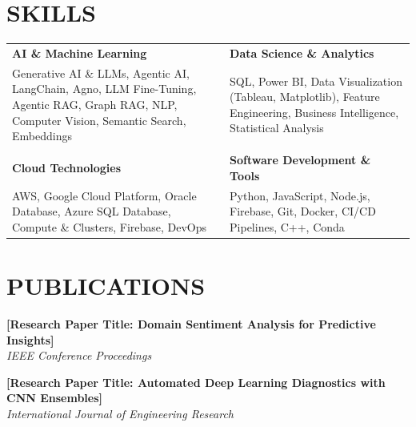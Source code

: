 \documentclass[a4paper,11pt]{article}
\newcommand{\safehref}[2]{#2}
\let\href\safehref
\newcommand{\extlink}{\raisebox{0.2ex}{\scriptsize\faExternalLink*}}
\begin{document}
\section*{SKILLS}
\setlength{\tabcolsep}{10pt}
\renewcommand{\arraystretch}{1.0}
\begin{tabularx}{\textwidth}{@{}>{\RaggedRight\arraybackslash}X >{\RaggedRight\arraybackslash}X@{}}
  \textbf{AI \& Machine Learning} & \textbf{Data Science \& Analytics} \\
  Generative AI \& LLMs, Agentic AI, LangChain, Agno, LLM Fine-Tuning, Agentic RAG, Graph RAG, NLP, Computer Vision, Semantic Search, Embeddings &
  SQL, Power BI, Data Visualization (Tableau, Matplotlib), Feature Engineering, Business Intelligence, Statistical Analysis \\
  \\[-3pt]
  \textbf{Cloud Technologies} & \textbf{Software Development \& Tools} \\
  AWS, Google Cloud Platform, Oracle Database, Azure SQL Database, Compute \& Clusters, Firebase, DevOps &
  Python, JavaScript, Node.js, Firebase, Git, Docker, CI/CD Pipelines, C++, Conda \\
\end{tabularx}

\section*{PUBLICATIONS}
\sloppy
\noindent\textbf{\href{https://example.com}{[Research Paper Title: Domain Sentiment Analysis for Predictive Insights]\ \extlink}}\\
\textit{IEEE Conference Proceedings}

\vspace{0.2cm}
\noindent\textbf{\href{https://example.com}{[Research Paper Title: Automated Deep Learning Diagnostics with CNN Ensembles]\ \extlink}}\\
\textit{International Journal of Engineering Research}
\fussy

\end{document}
